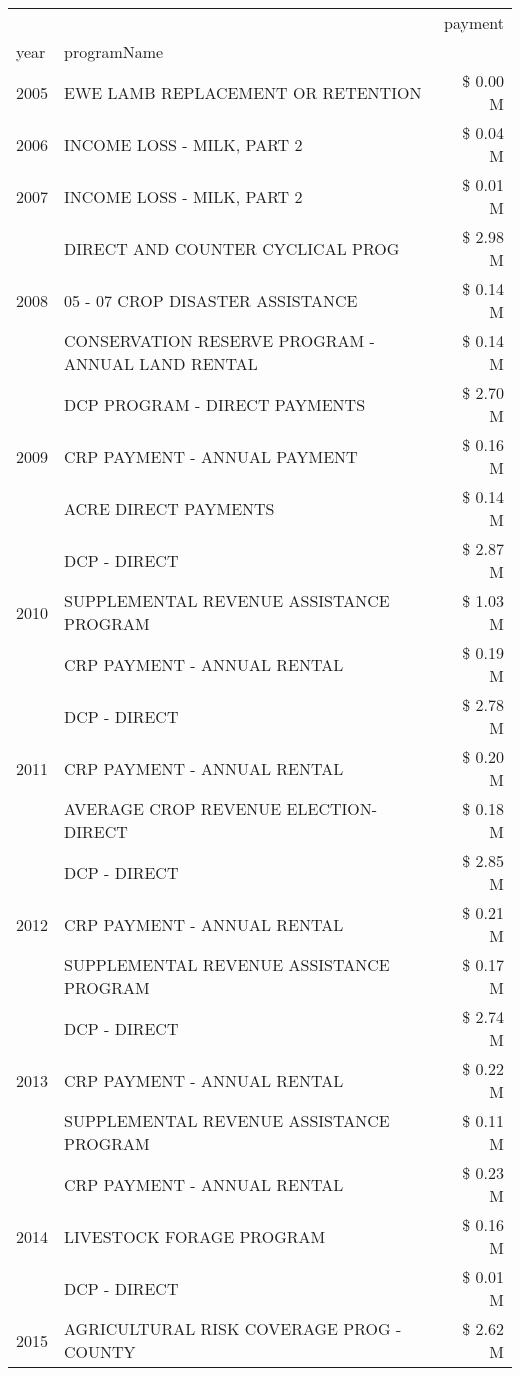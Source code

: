 \begin{tabular}{llr}
\toprule
 &  & payment \\
year & programName &  \\
\midrule
2005 & EWE LAMB REPLACEMENT OR RETENTION & \$ 0.00 M \\
\cline{1-3}
2006 & INCOME LOSS - MILK, PART 2 & \$ 0.04 M \\
\cline{1-3}
2007 & INCOME LOSS - MILK, PART 2 & \$ 0.01 M \\
\cline{1-3}
\multirow[t]{3}{*}{2008} & DIRECT AND COUNTER CYCLICAL PROG & \$ 2.98 M \\
 & 05 - 07 CROP DISASTER ASSISTANCE & \$ 0.14 M \\
 & CONSERVATION RESERVE PROGRAM - ANNUAL LAND RENTAL & \$ 0.14 M \\
\cline{1-3}
\multirow[t]{3}{*}{2009} & DCP PROGRAM - DIRECT PAYMENTS & \$ 2.70 M \\
 & CRP PAYMENT - ANNUAL PAYMENT & \$ 0.16 M \\
 & ACRE DIRECT PAYMENTS & \$ 0.14 M \\
\cline{1-3}
\multirow[t]{3}{*}{2010} & DCP - DIRECT & \$ 2.87 M \\
 & SUPPLEMENTAL REVENUE ASSISTANCE PROGRAM & \$ 1.03 M \\
 & CRP PAYMENT - ANNUAL RENTAL & \$ 0.19 M \\
\cline{1-3}
\multirow[t]{3}{*}{2011} & DCP - DIRECT & \$ 2.78 M \\
 & CRP PAYMENT - ANNUAL RENTAL & \$ 0.20 M \\
 & AVERAGE CROP REVENUE ELECTION-DIRECT & \$ 0.18 M \\
\cline{1-3}
\multirow[t]{3}{*}{2012} & DCP - DIRECT & \$ 2.85 M \\
 & CRP PAYMENT - ANNUAL RENTAL & \$ 0.21 M \\
 & SUPPLEMENTAL REVENUE ASSISTANCE PROGRAM & \$ 0.17 M \\
\cline{1-3}
\multirow[t]{3}{*}{2013} & DCP - DIRECT & \$ 2.74 M \\
 & CRP PAYMENT - ANNUAL RENTAL & \$ 0.22 M \\
 & SUPPLEMENTAL REVENUE ASSISTANCE PROGRAM & \$ 0.11 M \\
\cline{1-3}
\multirow[t]{3}{*}{2014} & CRP PAYMENT - ANNUAL RENTAL & \$ 0.23 M \\
 & LIVESTOCK FORAGE PROGRAM & \$ 0.16 M \\
 & DCP - DIRECT & \$ 0.01 M \\
\cline{1-3}
\multirow[t]{3}{*}{2015} & AGRICULTURAL RISK COVERAGE PROG - COUNTY & \$ 2.62 M \\

\end{tabular}
